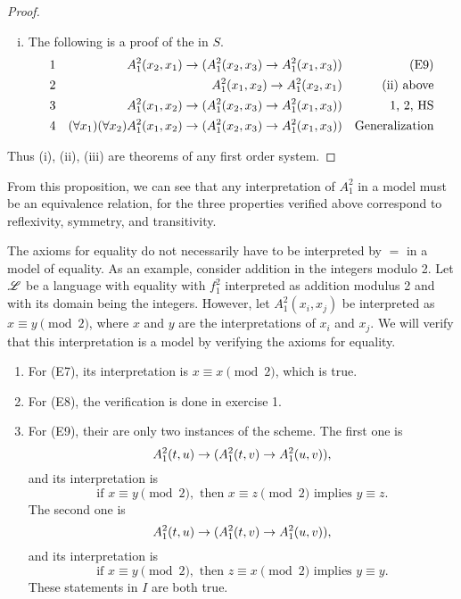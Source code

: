 \begin{proposition}
\begin{proof}
\begin{enumerate}[(i)]
      \item The following is a proof of the \wf{} in \(S\).
        \begin{align*}
          \text{1}&&
          A^2_1(x_2, x_1) \rightarrow (A^2_1(x_2, x_3) \rightarrow A^2_1(x_1, x_3))&&
          \text{(E9)}\\
          \text{2}&&
          A^2_1(x_1, x_2) \rightarrow A^2_1(x_2, x_1)&&
          \text{(ii) above}\\
          \text{3}&&
          A^2_1(x_1, x_2) \rightarrow (A^2_1(x_2, x_3) \rightarrow A^2_1(x_1, x_3))&&
          \text{1, 2, HS}\\
          \text{4}&&
          (\forall x_1)(\forall x_2) A^2_1(x_1, x_2) \rightarrow (A^2_1(x_2, x_3) \rightarrow A^2_1(x_1, x_3))&&
          \text{Generalization}
        \end{align*}
    \end{enumerate}
    Thus (i), (ii), (iii) are theorems of any first order system.
  \end{proof}
\end{proposition}

From this proposition, we can see that any interpretation of \(A^2_1\) in a model must be an equivalence relation, for the three properties verified above correspond to reflexivity, symmetry, and transitivity.

The axioms for equality do not necessarily have to be interpreted by \(=\) in a model of equality. As an example, consider addition in the integers modulo 2. Let \(\mathscr{L}\) be a language with equality with \(f^2_1\) interpreted as addition modulus 2 and with its domain being the integers. However, let \(A^2_1(x_i, x_j)\) be interpreted as \(x \equiv y \pmod{2}\), where \(x\) and \(y\) are the interpretations of \(x_i\) and \(x_j\). We will verify that this interpretation is a model by verifying the axioms for equality.
\begin{enumerate}
  \item For (E7), its interpretation is \(x \equiv x \pmod{2}\), which is true.
  \item For (E8), the verification is done in exercise 1.
  \item For (E9), their are only two instances of the scheme. The first one is
    \[A^2_1(t, u) \rightarrow (A^2_1(t, v) \rightarrow A^2_1(u, v)),\]
    and its interpretation is
    \[\text{if } x \equiv y \pmod{2}, \text{ then } x \equiv z \pmod{2} \text{ implies } y \equiv z.\]
    The second one is
    \[A^2_1(t, u) \rightarrow (A^2_1(t, v) \rightarrow A^2_1(u, v)),\]
    and its interpretation is
    \[\text{if } x \equiv y \pmod{2}, \text{ then } z \equiv x \pmod{2} \text{ implies } y \equiv y.\]
    These statements in \(I\) are both true. 
\end{enumerate}

